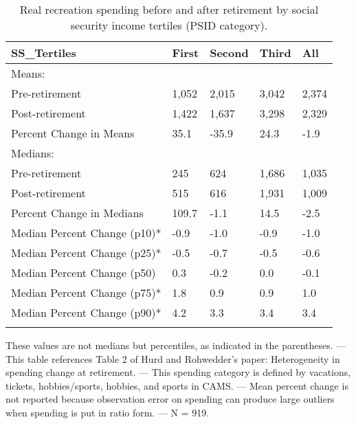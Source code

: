 \begin{table}[tbp] \centering
{}

\caption{Real recreation spending before and after retirement by social security income tertiles (PSID category).}
\begin{tabularx}{\textwidth}{lCCCC}

\toprule
{SS\_Tertiles}&{First}&{Second}&{Third}&{All} \tabularnewline
\midrule\addlinespace[1.5ex]
Means:&&&& \tabularnewline
\midrule Pre-retirement&1,052&2,015&3,042&2,374 \tabularnewline
Post-retirement&1,422&1,637&3,298&2,329 \tabularnewline
Percent Change in Means&35.1&-35.9&24.3&-1.9 \tabularnewline
\midrule Medians:&&&& \tabularnewline
\midrule Pre-retirement&245&624&1,686&1,035 \tabularnewline
Post-retirement&515&616&1,931&1,009 \tabularnewline
Percent Change in Medians&109.7&-1.1&14.5&-2.5 \tabularnewline
Median Percent Change (p10)*&-0.9&-1.0&-0.9&-1.0 \tabularnewline
Median Percent Change (p25)*&-0.5&-0.7&-0.5&-0.6 \tabularnewline
Median Percent Change (p50)&0.3&-0.2&0.0&-0.1 \tabularnewline
Median Percent Change (p75)*&1.8&0.9&0.9&1.0 \tabularnewline
Median Percent Change (p90)*&4.2&3.3&3.4&3.4 \tabularnewline
\bottomrule \addlinespace[1.5ex]

\end{tabularx}
\begin{flushleft}
\footnotesize *These values are not medians but percentiles, as indicated in the parentheses. \linebreak --- \linebreak This table references Table 2 of Hurd and Rohwedder's paper: Heterogeneity in spending change at retirement. \linebreak --- \linebreak This spending category is defined by vacations, tickets, hobbies/sports, hobbies, and sports in CAMS. \linebreak --- \linebreak Mean percent change is not reported because observation error on spending can produce large outliers when spending is put in ratio form. \linebreak --- \linebreak N = 919.
\end{flushleft}
\end{table}
